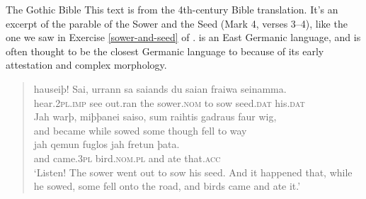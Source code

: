 \begin{texts}{The Gothic Bible}
This text is from the 4th-century  Bible translation. It's an excerpt of the parable of the Sower and the Seed (Mark 4, verses 3--4), like the one we saw in Exercise \ref{sower-and-seed} of .  is an East Germanic language, and is often thought to be the closest Germanic language to  because of its early attestation and complex morphology.

\begin{quote}
    \gll hauseiþ! Sai, urrann sa saiands du saian fraiwa seinamma.\\
    hear.\textsc{2pl.imp} see out.ran the sower.\textsc{nom} to sow seed.\textsc{dat} his.\textsc{dat}\\\newline
    \gll Jah warþ, miþþanei saiso, sum raihtis gadraus faur wig,\\
    and became while sowed some though fell to way\\\newline
    \gll jah qemun fuglos jah fretun þata.\\
    and came.\textsc{3pl} bird.\textsc{nom.pl} and ate that.\textsc{acc}\\\newline
    \trans `Listen! The sower went out to sow his seed. And it happened that, while he sowed, some fell onto the road, and birds came and ate it.'
\end{quote}


\end{texts}

